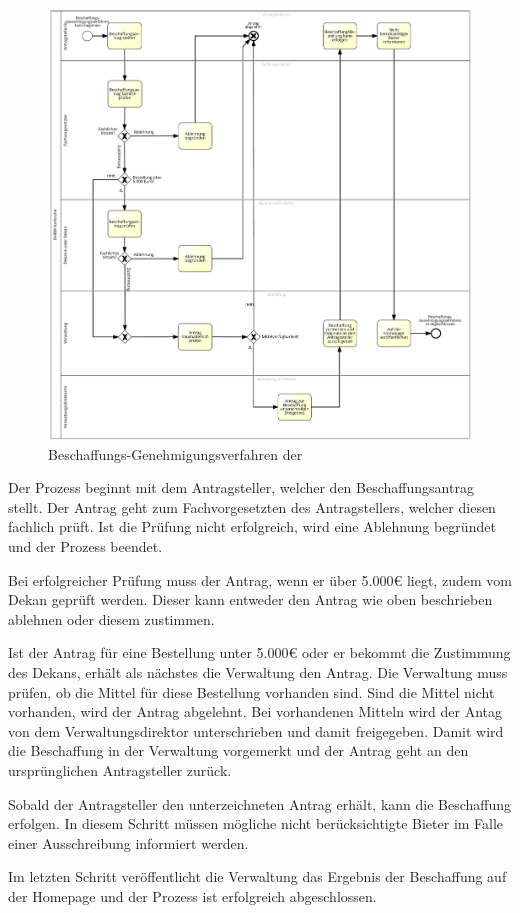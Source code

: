 \begin{figure}[h!tbp]
	\includegraphics[width=\textwidth]{images/beschaffungs-genehmigungsverfahren.png}
	\centering
	\caption{Beschaffungs-Genehmigungsverfahren der }
	\label{fig:beschaffungsverfahren}
\end{figure}

Der Prozess beginnt mit dem Antragsteller, welcher den Beschaffungsantrag stellt.
Der Antrag geht zum Fachvorgesetzten des Antragstellers, welcher diesen fachlich prüft.
Ist die Prüfung nicht erfolgreich, wird eine Ablehnung begründet und der Prozess beendet.

Bei erfolgreicher Prüfung muss der Antrag, wenn er über 5.000€ liegt, zudem vom Dekan geprüft werden.
Dieser kann entweder den Antrag wie oben beschrieben ablehnen oder diesem zustimmen.

Ist der Antrag für eine Bestellung unter 5.000€ oder er bekommt die Zustimmung des Dekans, erhält als nächstes die Verwaltung den Antrag.
Die Verwaltung muss prüfen, ob die Mittel für diese Bestellung vorhanden sind.
Sind die Mittel nicht vorhanden, wird der Antrag abgelehnt.
Bei vorhandenen Mitteln wird der Antag von dem Verwaltungsdirektor unterschrieben und damit freigegeben.
Damit wird die Beschaffung in der Verwaltung vorgemerkt und der Antrag geht an den ursprünglichen Antragsteller zurück.

Sobald der Antragsteller den unterzeichneten Antrag erhält, kann die Beschaffung erfolgen.
In diesem Schritt müssen mögliche nicht berücksichtigte Bieter im Falle einer Ausschreibung informiert werden.

Im letzten Schritt veröffentlicht die Verwaltung das Ergebnis der Beschaffung auf der Homepage und der Prozess ist erfolgreich abgeschlossen.
